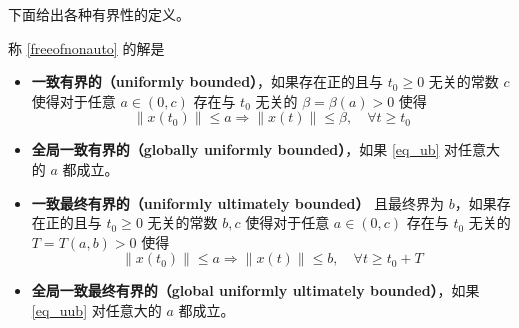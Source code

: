 下面给出各种有界性的定义。

\begin{definition}
称 \eqref{freeofnonauto} 的解是
\begin{itemize}[leftmargin=1em]
    \item \textbf{一致有界的（uniformly bounded）}，如果存在正的且与 $t_0 \geq 0$ 无关的常数 $c$ 使得对于任意 $a \in (0, c)$ 存在与 $t_0$ 无关的 $\beta = \beta(a) > 0$ 使得
    \begin{equation} \label{eq_ub}
        \| x (t_0) \| \leq a \Rightarrow \| x (t) \| \leq \beta, \quad \forall t \geq t_0
    \end{equation}
    \item \textbf{全局一致有界的（globally uniformly bounded）}，如果 \ref{eq_ub} 对任意大的 $a$ 都成立。
    \item \textbf{一致最终有界的（uniformly ultimately bounded）} 且最终界为 $b$，如果存在正的且与 $t_0 \geq 0$ 无关的常数 $b, c$ 使得对于任意 $a \in (0, c)$ 存在与 $t_0$ 无关的 $T = T (a, b) > 0$ 使得
    \begin{equation} \label{eq_uub}
        \| x (t_0) \| \leq a \Rightarrow \| x (t) \| \leq b, \quad \forall t \geq t_0 + T
    \end{equation}
    \item \textbf{全局一致最终有界的（global uniformly ultimately bounded）}，如果 \ref{eq_uub} 对任意大的 $a$ 都成立。
\end{itemize}
\end{definition}

